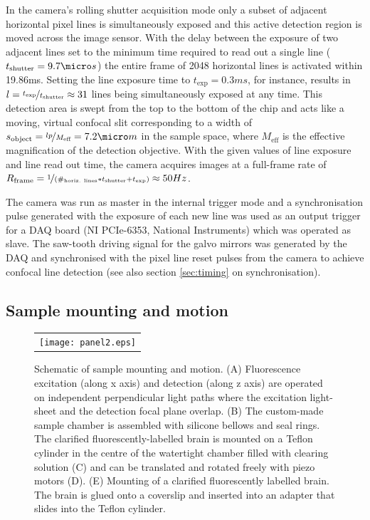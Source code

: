 \documentclass[12pt]{spieman}  %
\begin{document}
\begin{spacing}{2}
In the camera's rolling shutter acquisition mode only a subset of adjacent horizontal pixel lines is simultaneously exposed and this active detection region is moved across the image sensor\cite{Baumgart2012}. With the delay between the exposure of two adjacent lines set to the minimum time required to read out a single line ($t_{\text{shutter}}=9.7\micro s$) the entire frame of 2048 horizontal lines is activated within 19.86ms. Setting the line exposure time to $t_{\text{exp}}=0.3ms$, for instance, results in $l=\nicefrac{t_{\text{exp}}}{t_{\text{shutter}}}\approx31$  lines being simultaneously exposed at any time. This detection area is swept from the top to the bottom of the chip and acts like a moving, virtual confocal slit corresponding to a width of $s_{\text{object}}=\nicefrac{l p}{M_{\text{eff}}}= 7.2 \micro m $ in the sample space, where $M_{\text{eff}}$ is the effective magnification of the detection objective. With the given values of line exposure and line read out time, the camera acquires images at a full-frame rate of  $R_{\text{frame}} = \nicefrac{1}{(\#_{\text{horiz. lines}}*t_{\text{shutter}}+t_{\text{exp}})} \approx 50Hz$. 

The camera was run as master in the internal trigger mode and a synchronisation pulse generated with the exposure of each new line was used as an output trigger for a DAQ board (NI PCIe-6353, National Instruments) which was operated as slave. The saw-tooth driving signal for the galvo mirrors was generated by the DAQ and synchronised with the pixel line reset pulses from the camera to achieve confocal line detection (see also section \ref{sec:timing} on synchronisation).  

\subsection{Sample mounting and motion}
\label{sec:mounting}
		
\begin{figure}
   \begin{center}
   \begin{tabular}{c}
   \texttt{[image: panel2.eps]}
   \end{tabular}
   \end{center}
   \caption{\label{fig:frame2} Schematic of sample mounting and motion. (A) Fluorescence excitation (along x axis) and detection (along z axis) are operated on independent perpendicular light paths where the excitation light-sheet and the detection focal plane overlap. (B) The custom-made sample chamber is assembled with silicone bellows and seal rings. The clarified fluorescently-labelled brain is mounted on a Teflon cylinder in the centre of the watertight chamber filled with clearing solution (C) and can be translated and rotated freely with piezo motors (D). (E) Mounting of a clarified fluorescently labelled brain. The brain is glued onto a coverslip and inserted into an adapter that slides into the Teflon cylinder.} 
   \end{figure}		


\end{spacing}
\end{document}
